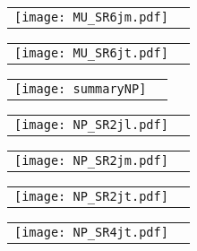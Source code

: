 \documentclass[landscape,12pt,a4paper]{article}
\begin{document}
\begin{figure}[h]\begin{center}\begin{tabular}{cc}\texttt{[image: MU\_SR6jm.pdf]}\end{tabular}\end{center}\end{figure}
\begin{figure}[h]\begin{center}\begin{tabular}{cc}\texttt{[image: MU\_SR6jt.pdf]}\end{tabular}\end{center}\end{figure}
\begin{figure}[h]\begin{center}\begin{tabular}{cc}\texttt{[image: summaryNP]}\end{tabular}\end{center}\end{figure}
\clearpage
\begin{figure}[h]\begin{center}\begin{tabular}{cc}\texttt{[image: NP\_SR2jl.pdf]}\end{tabular}\end{center}\end{figure}
\begin{figure}[h]\begin{center}\begin{tabular}{cc}\texttt{[image: NP\_SR2jm.pdf]}\end{tabular}\end{center}\end{figure}
\begin{figure}[h]\begin{center}\begin{tabular}{cc}\texttt{[image: NP\_SR2jt.pdf]}\end{tabular}\end{center}\end{figure}
\begin{figure}[h]\begin{center}\begin{tabular}{cc}\texttt{[image: NP\_SR4jt.pdf]}\end{tabular}\end{center}\end{figure}
\end{document}
